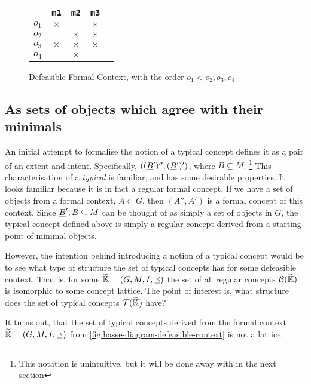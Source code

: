 \documentclass[11pt]{article}
\begin{document}
\begin{figure}[h]
  \begin{center}
    \begin{tabular}{r|cccc}
            & \texttt{m1} & \texttt{m2} & \texttt{m3} \\ \hline
      $o_1$ & $\times$    &             & $\times$    \\
      $o_2$ &             & $\times$    & $\times$    \\
      $o_3$ & $\times$    & $\times$    & $\times$    \\
      $o_4$ &             & $\times$    &             \\
    \end{tabular}
  \end{center}
  \caption{Defeasible Formal Context, with the order $o_1 < o_2, o_3, o_4$}
  \label{fig:defeasible-context}
\end{figure}

\subsection{As sets of objects which agree with their minimals}
An initial attempt to formalise the notion of a typical concept defines it as a pair of an extent and intent. Specifically, $((\underline{B}')'', (\underline{B}')')$, where $B \subseteq M$. \footnote{This notation is unintuitive, but it will be done away with in the next section} This characterisation of a \textit{typical} is familiar, and has some desirable properties. It looks familiar because it is in fact a regular formal concept. If we have a set of objects from a formal context, $A \subset G$, then $(A'', A')$ is a formal concept of this context. Since $\underline{B}', B\subseteq M$ can be thought of as simply a set of objects in $G$, the typical concept defined above is simply a regular concept derived from a starting point of minimal objects.

However, the intention behind introducing a notion of a typical concept would be to see what type of structure the set of typical concepts has for some defeasible context. That is, for some $\widetilde{\mathbb{K}} = (G,M,I,\preceq)$ the set of all regular concepts $\mathcal{B}(\widetilde{\mathbb{K}})$ is isomorphic to some concept lattice. The point of interest is, what structure does the set of typical concepts $\mathcal{T}(\widetilde{\mathbb{K}})$ have?

It turns out, that the set of typical concepts derived from the formal context $\widetilde{\mathbb{K}} = (G,M,I,\preceq)$ from \autoref{fig:hasse-diagram-defeasible-context} is not a lattice.
\end{document}
